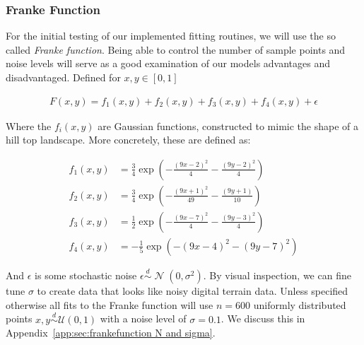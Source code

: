 \documentclass[twocolumn,english,notitlepage]{article}
\newcommand{\pclosed}[1]{\left(#1\right)}
\newcommand{\exptext}[1]{\operatorname{exp}\pclosed{#1}}
\newcommand{\normal}[2]{\operatorname{\mathcal{N}}\pclosed{#1,#2}}
\newcommand{\distas}{\overset{d}{\sim}}
\begin{document}
        \subsubsection{Franke Function}

            For the initial testing of our implemented fitting routines, we will use the so called \textit{Franke function}. Being able to control the number of sample points and noise levels will serve as a good examination of our models advantages and disadvantaged. Defined for $x, y \in [0,1]$

            \begin{align}
                F(x,y) = f_1(x,y) + f_2(x,y) + f_3(x,y) + f_4(x,y) + \epsilon \label{met:eq:Franke_Function}
            \end{align}

            Where the $f_i(x,y)$ are Gaussian functions, constructed to mimic the shape of a hill top landscape. More concretely, these are defined as:

            \begin{align} \nonumber
                f_1(x,y) &= \frac{3}{4}\exptext{ -\frac{(9x-2)^2}{4} - \frac{(9y-2)^2}{4} } \nonumber \\
                f_2(x,y) &= \frac{3}{4}\exptext{ -\frac{(9x+1)^2}{49} - \frac{(9y+1)}{10}} \nonumber \\
                f_3(x,y) &= \frac{1}{2}\exptext{ -\frac{(9x-7)^2}{4} - \frac{(9y-3)^2}{4}} \nonumber \\
                f_4(x,y) &= -\frac{1}{5}\exptext{ -(9x-4)^2 - (9y-7)^2} \nonumber
            \end{align}

            And $\epsilon$ is some stochastic noise $\epsilon \distas \normal{0}{\sigma^2}$. By visual inspection, we can fine tune $\sigma$ to create data that looks like noisy digital terrain data. Unless specified otherwise all fits to the Franke function will use $n = 600$ uniformly distributed points $x,y \distas \mathcal{U}(0,1)$ with a noise level of $\sigma = 0.1$. We discuss this in Appendix~\ref{app:sec:frankefunction N and sigma}.   
\end{document}

